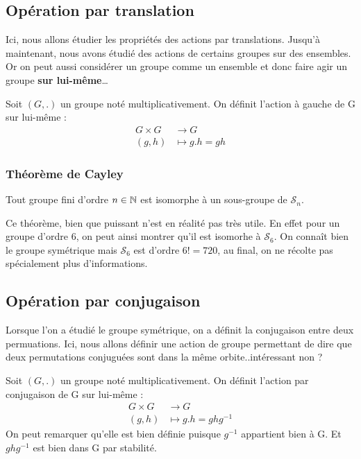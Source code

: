 \subsection{Opération par translation}

Ici, nous allons étudier les propriétés des actions par translations. 
Jusqu'à maintenant, nous avons étudié des actions de certains groupes sur des ensembles. 
Or on peut aussi considérer un groupe comme un ensemble et donc faire agir un groupe \textbf{sur lui-même}\dots

\begin{definition}
	Soit $(G,.)$ un groupe noté multiplicativement. On définit l'action à gauche de G sur lui-même :
		\begin{align*}
			G \times G &\longrightarrow G \\ 
			(g,h) &\longmapsto g.h = gh 
		\end{align*}
\end{definition}

\subsubsection{Théorème de Cayley}

\begin{theorem}[Cayley, 1878]
	Tout groupe fini d'ordre $n \in \mathbb{N}$ est isomorphe à un sous-groupe de $\mathcal{S}_n$. 
\end{theorem}

Ce théorème, bien que puissant n'est en réalité pas très utile. 
En effet pour un groupe d'ordre 6, on peut ainsi montrer qu'il est isomorhe à $\mathcal{S}_6$.
On connaît bien le groupe symétrique mais $\mathcal{S}_6$ est d'ordre $6! = 720$, au final, on ne récolte pas spécialement plus d'informations. 

\subsection{Opération par conjugaison}

Lorsque l'on a étudié le groupe symétrique, on a définit la conjugaison entre deux permuations. 
Ici, nous allons définir une action de groupe permettant de dire que deux permutations conjuguées
sont dans la même orbite..intéressant non ?

\begin{definition}
	Soit $(G,.)$ un groupe noté multiplicativement. On définit l'action par conjugaison de G sur lui-même :
		\begin{align*}
			G \times G &\longrightarrow G \\
			(g,h) &\longmapsto g.h = g h g^{-1}
		\end{align*}	
	On peut remarquer qu'elle est bien définie puisque $g^{-1}$ appartient bien à G. 
	Et $g h g^{-1}$ est bien dans G par stabilité. 
\end{definition}

